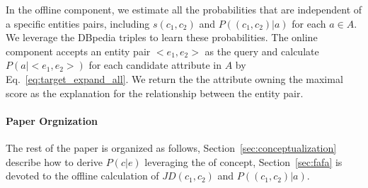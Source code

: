 In the offline component, we estimate all the probabilities that are independent of a specific entities pairs, including $s(c_1,c_2)$ and $P((c_{1},c_{2})|a)$ for each $a\in A$.  
We leverage the DBpedia triples to learn these probabilities. 
The online component accepts an entity pair $<e_1, e_2>$ as the query and calculate $ P(a| <e_1,e_2> )$ for each candidate attribute in $A$ by Eq.~\ref{eq:target_expand_all}. We return the the attribute owning the maximal score as the explanation for the relationship between the entity pair. 


\paragraph{Paper Orgnization}
The rest of the paper is organized as follows, Section~\ref{sec:conceptualization} describe how to derive $P(c|e)$ leveraging the  of concept, Section~\ref{sec:fafa} is devoted to the offline calculation of $JD(c_1,c_2)$ and $P((c_{1},c_{2})|a)$. 

%
%
%
%
%
%
%
%
%
%
%
%
%
